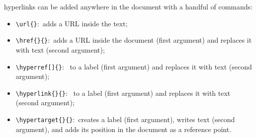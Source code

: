 \noindent \Glspl{hyperlink} can be added anywhere in the document with a handful of \glspl{command}:
\begin{itemize}
    \item \texttt{\textbackslash{}url\{\}}:~adds a \gls{URL} inside the text;
    \item \texttt{\textbackslash{}href\{\}\{\}}:~adds a \gls{URL} inside the document (first \gls{argument}) and replaces it with text (second \gls{argument});
    \item \texttt{\textbackslash{}hyperref[]\{\}}:~ to a \gls{label} (first \gls{argument}) and replaces it with text (second \gls{argument});
    \item \texttt{\textbackslash{}hyperlink\{\}\{\}}:~ to a \gls{label} (first \gls{argument}) and replaces it with text (second \gls{argument});
    \item \verb"\hypertarget{}{}":~creates a \gls{label} (first \gls{argument}), writes text (second \gls{argument}), and adds its position in the document as a \gls{reference} point.
\end{itemize}
